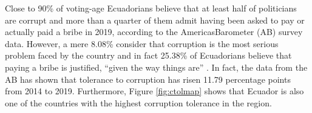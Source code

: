 \documentclass[12pt,a4]{article}\usepackage[]{graphicx}\usepackage[]{xcolor}
\begin{document}


Close to 90\% of voting-age Ecuadorians believe that at least half of politicians are corrupt and more than a quarter of them admit having been asked to pay or actually paid a bribe in 2019, according to the AmericasBarometer (AB) survey data. However, a mere 8.08\% consider that corruption is the most serious problem faced by the country and in fact 25.38\% of Ecuadorians believe that paying a bribe is justified, \enquote{given the way things are} \parencite[p. 96]{Moscoso.2018}. In fact, the data from the AB has shown that tolerance to corruption has risen 11.79 percentage points from 2014 to 2019. Furthermore, Figure \ref{fig:ctolmap} shows that Ecuador is also one of the countries with the highest corruption tolerance in the region.



\begin{figure}[htbp]
\end{figure}
\end{document}
